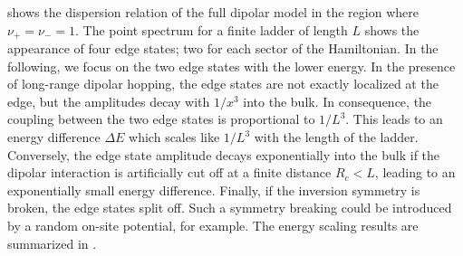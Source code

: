  shows the dispersion relation of the full dipolar model in the region where $\nu_+ = \nu_- = 1$.
The point spectrum for a finite ladder of length $L$ shows the appearance of four edge states; two for each sector of the Hamiltonian.
In the following, we focus on the two edge states with the lower energy.
In the presence of long-range dipolar hopping, the edge states are not exactly localized at the edge, but the amplitudes decay with $1/x^3$ into the bulk.
In consequence, the coupling between the two edge states is proportional to $1/L^3$.
This leads to an energy difference $\Delta E$ which scales like $1/L^3$ with the length of the ladder.
Conversely, the edge state amplitude decays exponentially into the bulk if the dipolar interaction is artificially cut off at a finite distance $R_c < L$, leading to an exponentially small energy difference.
Finally, if the inversion symmetry is broken, the edge states split off.
Such a symmetry breaking could be introduced by a random on-site potential, for example.
The energy scaling results are summarized in .





